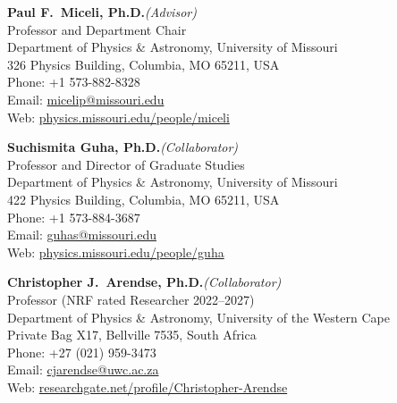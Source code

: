 

\noindent
\begin{minipage}[t]{0.48\textwidth}
\textbf{Paul F.\ Miceli, Ph.D.}\quad\textit{(Advisor)}\\
Professor and Department Chair\\
Department of Physics \& Astronomy, University of Missouri\\
326 Physics Building, Columbia, MO 65211, USA\\
Phone: +1 573-882-8328\\
Email: \href{mailto:micelip@missouri.edu}{micelip@missouri.edu}\\
Web: \href{https://physics.missouri.edu/people/miceli}{physics.missouri.edu/people/miceli}
\end{minipage}\hfill
\begin{minipage}[t]{0.48\textwidth}
\textbf{Suchismita Guha, Ph.D.}\quad\textit{(Collaborator)}\\
Professor and Director of Graduate Studies\\
Department of Physics \& Astronomy, University of Missouri\\
422 Physics Building, Columbia, MO 65211, USA\\
Phone: +1 573-884-3687\\
Email: \href{mailto:guhas@missouri.edu}{guhas@missouri.edu}\\
Web: \href{https://physics.missouri.edu/people/guha}{physics.missouri.edu/people/guha}
\end{minipage}

\vspace{1em}

\begin{center}
\begin{minipage}{0.6\textwidth}
\centering
\textbf{Christopher J.\ Arendse, Ph.D.}\quad\textit{(Collaborator)}\\
Professor (NRF rated Researcher 2022–2027)\\
Department of Physics \& Astronomy, University of the Western Cape\\
Private Bag X17, Bellville 7535, South Africa\\
Phone: +27 (021) 959-3473\\
Email: \href{mailto:cjarendse@uwc.ac.za}{cjarendse@uwc.ac.za}\\
Web: \href{https://www.researchgate.net/profile/Christopher-Arendse}{researchgate.net/profile/Christopher-Arendse}
\end{minipage}
\end{center}
